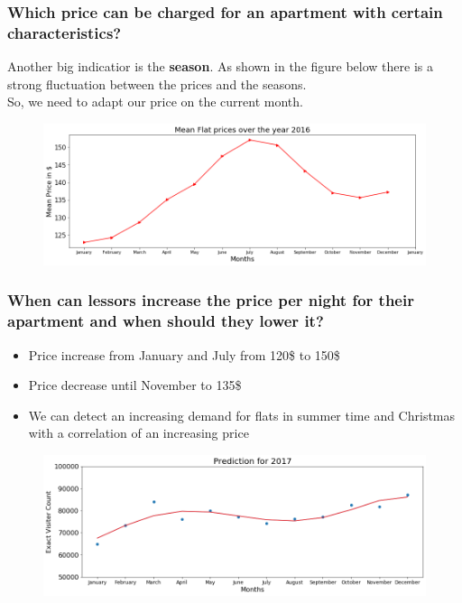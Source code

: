 \documentclass{beamer}
\begin{document}
\begin{frame}
\frametitle{Which price can be charged for an apartment with certain characteristics?}
Another big indicatior is the \textbf{season}. As shown in the figure below there is a strong fluctuation between the prices and the seasons.\\ So, we need to adapt our price on the current month.
\begin{figure}
\includegraphics[width=0.8\linewidth]{photo/12_mean_flat_prices_2016}
\end{figure}
\end{frame}
\begin{frame}
\frametitle{When can lessors increase the price per night for their apartment and when should they lower it?}
\begin{itemize}
\item Price increase from January and July from 120\$ to 150\$
\item Price decrease until November to 135\$
\item We can detect an increasing demand for flats in summer time and Christmas with a correlation of an increasing price
\end{itemize}
\begin{figure}
\includegraphics[width=0.8\linewidth]{photo/6_prediction_2017}
\end{figure}
\end{frame}
\end{document}
